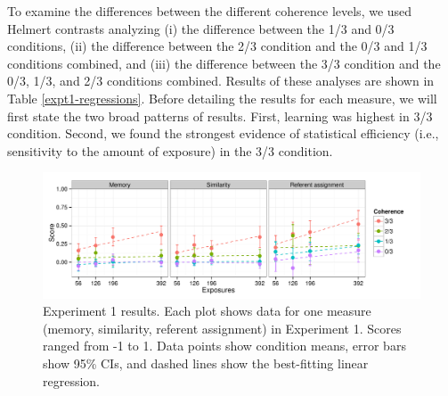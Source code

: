 \documentclass[man,floatsintext]{apa6}
\begin{document}
To examine the differences between the different coherence levels, we used Helmert contrasts analyzing (i) the difference between the 1/3 and 0/3 conditions, (ii) the difference between the 2/3 condition and the 0/3 and 1/3 conditions combined, and (iii) the difference between the 3/3 condition and the 0/3, 1/3, and 2/3 conditions combined. Results of these analyses are shown in Table \ref{expt1-regressions}. Before detailing the results for each measure, we will first state the two broad patterns of results. First, learning was highest in 3/3 condition. Second, we found the strongest evidence of statistical efficiency (i.e., sensitivity to the amount of exposure) in the 3/3 condition.

\begin{figure}[t]
  \begin{center}
    \includegraphics[width=1.0\linewidth]{x1}
    \caption{Experiment 1 results. Each plot shows data for one measure (memory, similarity, referent assignment) in Experiment 1. Scores ranged from -1 to 1. Data points show condition means, error bars show 95\% CIs, and dashed lines show the best-fitting linear regression.}
    \label{expt1-results}
  \end{center}
\end{figure}

\newcommand{\ww}{\color{white}{*}} \newcommand\T{\rule{0pt}{2.1ex}}
\end{document}
